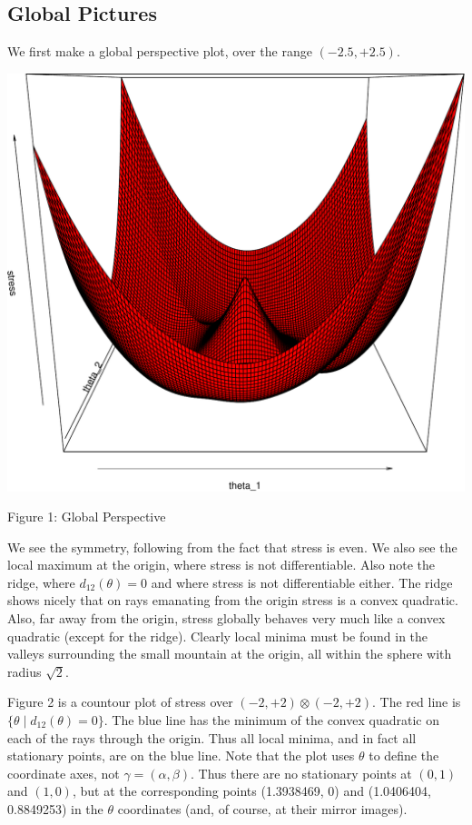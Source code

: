 \documentclass[
  12pt,
]{article}
\begin{document}
\subsection{Global Pictures}\label{global-pictures}

We first make a global perspective plot, over the range \((-2.5,+2.5)\).

\begin{center}\includegraphics{twoPoints_files/figure-latex/global_perspective-1} \end{center}

Figure 1: Global Perspective

We see the symmetry, following from the fact that stress is even. We also see the local maximum at the origin, where stress is not differentiable. Also note the ridge, where \(d_{12}(\theta)=0\) and where stress is not differentiable either.
The ridge shows nicely that on rays emanating from the origin stress is a convex quadratic. Also, far away from the origin, stress globally behaves very much like a convex quadratic (except for the ridge). Clearly local minima must be found in the valleys surrounding the small mountain at the origin, all within the sphere
with radius \(\sqrt{2}\).

Figure 2 is a countour plot of stress over \((-2,+2)\otimes(-2,+2)\). The red line is \(\{\theta\mid d_{12}(\theta) = 0\}\). The blue line has the minimum of the convex quadratic on each of the rays through the origin. Thus all local minima, and in fact all stationary points, are on the blue line. Note that the plot uses \(\theta\) to define the coordinate axes, not \(\gamma=(\alpha,\beta)\). Thus there are no stationary points at \((0,1)\) and \((1,0)\), but at the corresponding points (1.3938469, 0) and (1.0406404, 0.8849253) in the \(\theta\) coordinates (and, of course, at their mirror images).
\end{document}
